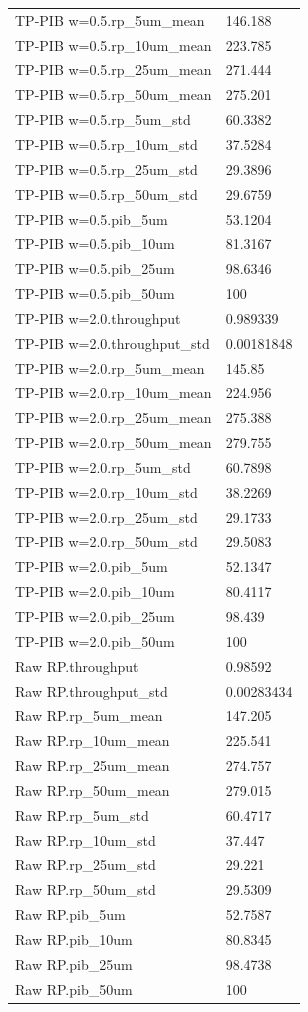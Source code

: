 \begin{longtable}{p{}p{}}
TP-PIB w=0.5.rp\_5um\_mean & 146.188\\
TP-PIB w=0.5.rp\_10um\_mean & 223.785\\
TP-PIB w=0.5.rp\_25um\_mean & 271.444\\
TP-PIB w=0.5.rp\_50um\_mean & 275.201\\
TP-PIB w=0.5.rp\_5um\_std & 60.3382\\
TP-PIB w=0.5.rp\_10um\_std & 37.5284\\
TP-PIB w=0.5.rp\_25um\_std & 29.3896\\
TP-PIB w=0.5.rp\_50um\_std & 29.6759\\
TP-PIB w=0.5.pib\_5um & 53.1204\\
TP-PIB w=0.5.pib\_10um & 81.3167\\
TP-PIB w=0.5.pib\_25um & 98.6346\\
TP-PIB w=0.5.pib\_50um & 100\\
TP-PIB w=2.0.throughput & 0.989339\\
TP-PIB w=2.0.throughput\_std & 0.00181848\\
TP-PIB w=2.0.rp\_5um\_mean & 145.85\\
TP-PIB w=2.0.rp\_10um\_mean & 224.956\\
TP-PIB w=2.0.rp\_25um\_mean & 275.388\\
TP-PIB w=2.0.rp\_50um\_mean & 279.755\\
TP-PIB w=2.0.rp\_5um\_std & 60.7898\\
TP-PIB w=2.0.rp\_10um\_std & 38.2269\\
TP-PIB w=2.0.rp\_25um\_std & 29.1733\\
TP-PIB w=2.0.rp\_50um\_std & 29.5083\\
TP-PIB w=2.0.pib\_5um & 52.1347\\
TP-PIB w=2.0.pib\_10um & 80.4117\\
TP-PIB w=2.0.pib\_25um & 98.439\\
TP-PIB w=2.0.pib\_50um & 100\\
Raw RP.throughput & 0.98592\\
Raw RP.throughput\_std & 0.00283434\\
Raw RP.rp\_5um\_mean & 147.205\\
Raw RP.rp\_10um\_mean & 225.541\\
Raw RP.rp\_25um\_mean & 274.757\\
Raw RP.rp\_50um\_mean & 279.015\\
Raw RP.rp\_5um\_std & 60.4717\\
Raw RP.rp\_10um\_std & 37.447\\
Raw RP.rp\_25um\_std & 29.221\\
Raw RP.rp\_50um\_std & 29.5309\\
Raw RP.pib\_5um & 52.7587\\
Raw RP.pib\_10um & 80.8345\\
Raw RP.pib\_25um & 98.4738\\
Raw RP.pib\_50um & 100\\
\end{longtable}

